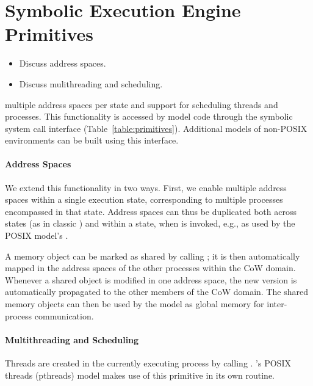
\section{Symbolic Execution Engine Primitives}
\label{sec:symbolic-engine-modifications}

\begin{itemize}
\item Discuss address spaces.
\item Discuss mulithreading and scheduling.
\end{itemize}

 multiple address spaces per state and support for scheduling threads and processes.  This functionality is accessed by model code through the symbolic system call interface (Table~\ref{table:primitives}).  Additional models of non-POSIX environments can be built using this interface.

\paragraph{Address Spaces}    We extend this functionality in two ways.  First, we enable multiple address spaces within a single execution state, corresponding to multiple processes encompassed in that state. Address spaces can thus be duplicated both across states (as in classic \klee) and within a state, when  is invoked, e.g., as used by the POSIX model's .

  A memory object can be marked as shared by calling ; it is then automatically mapped in the address spaces of the other processes within the CoW domain.  Whenever a shared object is modified in one address space, the new version is automatically propagated to the other members of the CoW domain.  The shared memory objects can then be used by the model as global memory for inter-process communication.

\paragraph{Multithreading and Scheduling}  Threads are created in the currently executing process by calling .  \cnine's POSIX threads (pthreads) model makes use of this primitive in its own  routine.


